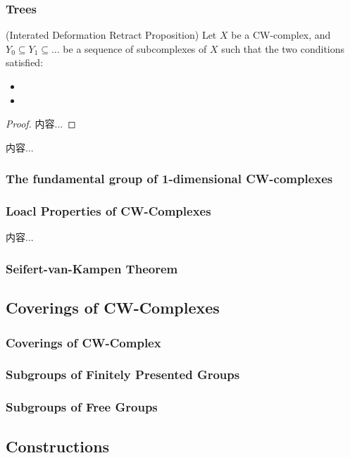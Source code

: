 \documentclass[Total.tex]{subfiles}
\begin{document}
		\subsubsection{Trees}
			\begin{proposition}
				(Interated Deformation Retract Proposition) Let $X$ be a CW-complex, and $Y_0\subseteq Y_1\subseteq \dots$ be a sequence of subcomplexes of $X$ such that the two conditions satisfied:
				\begin{itemize}
					\item 
					\item 
				\end{itemize}
			\end{proposition}
			\begin{proof}
				内容...
			\end{proof}
			\begin{Def}
				内容...
			\end{Def}
		\subsubsection{The fundamental group of 1-dimensional CW-complexes}
		\subsubsection{Loacl Properties of CW-Complexes}
			\begin{proposition}
				内容...
			\end{proposition}
		\subsubsection{Seifert-van-Kampen Theorem}
	\subsection{Coverings of CW-Complexes}
		\subsubsection{Coverings of CW-Complex}
		\subsubsection{Subgroups of Finitely Presented Groups}
		\subsubsection{Subgroups of Free Groups}
	\subsection{Constructions}
\end{document}
